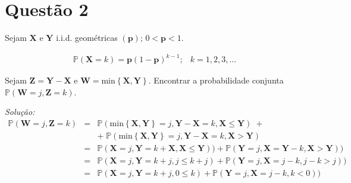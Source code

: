 \documentclass[a4paper, 11pt]{article}
\begin{document}
\section*{Questão 2} Sejam $\mathbf{X}$ e $\mathbf{Y}$ i.i.d. geométricas $(\mathbf{p})$; $0<\mathbf{p}<1$.

\begin{equation*}
\begin{array}{lclll}
\mathds{P}(\mathbf{X} = k) = \mathbf{p}(1-\mathbf{p})^{k-1}; & k = 1,2,3,\ldots
\end{array}
\end{equation*}

Sejam $\mathbf{Z} = \mathbf{Y} - \mathbf{X}$ e $\mathbf{W} = \mathrm{min}\left\{ \mathbf{X}, \mathbf{Y} \right\}$. Encontrar a probabilidade conjunta $\mathds{P}(\mathbf{W} = j,\mathbf{Z} = k)$.

\noindent
\textit{Solução:} \\
\begin{equation*}
\begin{array}{lclll}
\mathds{P}(\mathbf{W} = j, \mathbf{Z} = k) & = &  \mathds{P}(\mathrm{min}\left\{ \mathbf{X}, \mathbf{Y} \right\} = j, \mathbf{Y} - \mathbf{X} = k, \mathbf{X} \leq \mathbf{Y}) \; +  \\
&  & + \; \mathds{P}(\mathrm{min}\left\{ \mathbf{X}, \mathbf{Y} \right\} = j, \mathbf{Y} - \mathbf{X} = k, \mathbf{X} > \mathbf{Y}) \\

& = & \mathds{P}(\mathbf{X} = j, \mathbf{Y} = k + \mathbf{X}, \mathbf{X} \leq \mathbf{Y})) + \mathds{P}(\mathbf{Y} = j, \mathbf{X} = \mathbf{Y} - k, \mathbf{X} > \mathbf{Y}))  \\

& = & \mathds{P}(\mathbf{X} = j, \mathbf{Y} = k + j, j \leq k+j) + \mathds{P}(\mathbf{Y} = j, \mathbf{X} = j - k, j - k > j))  \\

& = & \mathds{P}(\mathbf{X} = j, \mathbf{Y} = k + j, 0 \leq k) + \mathds{P}(\mathbf{Y} = j, \mathbf{X} = j - k, k < 0))  \\
\end{array}
\end{equation*}
\end{document}
